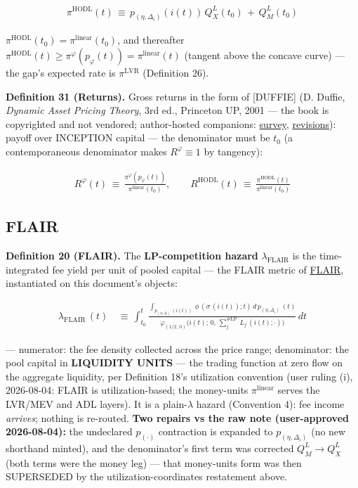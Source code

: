 \documentclass[11pt]{article}
\renewcommand{\_}{\textunderscore\allowbreak}
\begin{document}
\[
    \begin{aligned}
        \pi^{\text{HODL}}(t) \, \equiv \, p_{(\eta,\Delta_i)}(i(t))\,Q_X^L(t_0) \, + \, Q_M^L(t_0)
    \end{aligned}
\]

\(\pi^{\text{HODL}}(t_0) = \pi^{\text{linear}}(t_0)\), and thereafter \(\pi^{\text{HODL}}(t) \geq \pi^{\varphi}(p_{\varphi}(t)) = \pi^{\text{linear}}(t)\) (tangent above the concave curve) --- the gap's expected rate is \(\pi^{\mathrm{LVR}}\) (Definition 26).

\textbf{Definition 31 (Returns).} Gross returns in the form of {[}DUFFIE{]} (D. Duffie, \emph{Dynamic Asset Pricing Theory}, 3rd ed., Princeton UP, 2001 --- the book is copyrighted and not vendored; author-hosted companions: \href{../refs/duffie-intertemporal_asset_pricing_survey.pdf}{survey}, \href{../refs/duffie-dapt-revisions-2002.pdf}{revisions}): payoff over INCEPTION capital --- the denominator must be \(t_0\) (a contemporaneous denominator makes \(R^{\varphi} \equiv 1\) by tangency):

\[
    \begin{aligned}
        R^{\varphi}(t) \, \equiv \, \frac{\pi^{\varphi}(p_{\varphi}(t))}{\pi^{\text{linear}}(t_0)}, \qquad
        R^{\text{HODL}}(t) \, \equiv \, \frac{\pi^{\text{HODL}}(t)}{\pi^{\text{linear}}(t_0)}
    \end{aligned}
\]

\subsection*{FLAIR}\label{flair}

\textbf{Definition 20 (FLAIR).} The \textbf{LP-competition hazard} \(\lambda_{\text{FLAIR}}\) is the time-integrated fee yield per unit of pooled capital --- the FLAIR metric of \href{../refs/flair/MilionisWanAdamsFLAIR.pdf}{FLAIR}, instantiated on this document's objects:

\[
    \begin{aligned}
        \lambda_{\text{FLAIR}}\, (t) \, &\equiv \, \displaystyle\int_{t_0}^t \frac{\displaystyle\int_{p_{(\eta,\Delta_i)} \,(i(t))} \, \phi \, ( \sigma \, (i (t));t) \, d\, p_{(\eta,\Delta_i)} \,(t)}{\varphi_{(1/2,\,0)}\Big(i(t);\, 0,\, \sum_{j}^{\# \text{LP}} \, L_j \, (i(t); \cdot)\Big)} \, dt
    \end{aligned}
\]

--- numerator: the fee density collected across the price range; denominator: the pool capital in \textbf{LIQUIDITY UNITS} --- the trading function at zero flow on the aggregate liquidity, per Definition 18's utilization convention (user ruling (i), 2026-08-04: FLAIR is utilization-based; the money-units \(\pi^{\text{linear}}\) serves the LVR/MEV and ADL layers). It is a plain-\(\lambda\) hazard (Convention 4): fee income \emph{arrives}; nothing is re-routed. \textbf{Two repairs vs the raw note (user-approved 2026-08-04):} the undeclared \(p_{(\cdot)}\) contraction is expanded to \(p_{(\eta,\Delta_i)}\) (no new shorthand minted), and the denominator's first term was corrected \(Q_M^L \to Q_X^L\) (both terms were the money leg) --- that money-units form was then SUPERSEDED by the utilization-coordinates restatement above.
\end{document}
